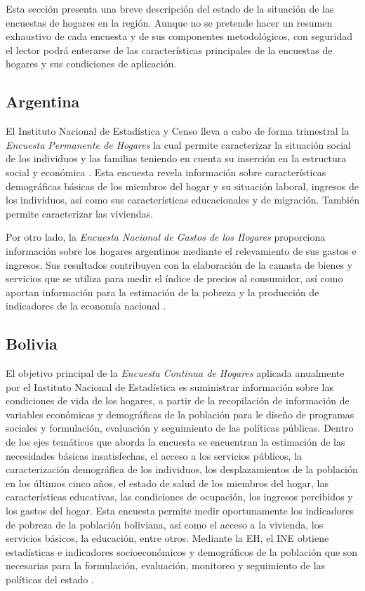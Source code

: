 Esta sección presenta una breve descripción del estado de la situación de las encuestas de hogares en la región. Aunque no se pretende hacer un resumen exhaustivo de cada encuesta y de sus componentes metodológicos, con seguridad el lector podrá enterarse de las características principales de la encuestas de hogares y sus condiciones de aplicación.

\hypertarget{argentina}{%
\subsection*{Argentina}\label{argentina}}


El Instituto Nacional de Estadística y Censo lleva a cabo de forma trimestral la \emph{Encuesta Permanente de Hogares} la cual permite caracterizar la situación social de los individuos y las familias teniendo en cuenta su inserción en la estructura social y económica \citep{INDEC-AR}. Esta encuesta revela información sobre características demográficas básicas de los miembros del hogar y su situación laboral, ingresos de los individuos, así como sus características educacionales y de migración. También permite caracterizar las viviendas.

Por otro lado, la \emph{Encuesta Nacional de Gastos de los Hogares} proporciona información sobre los hogares argentinos mediante el relevamiento de sus gastos e ingresos. Sus resultados contribuyen con la elaboración de la canasta de bienes y servicios que se utiliza para medir el índice de precios al consumidor, así como aportan información para la estimación de la pobreza y la producción de indicadores de la economía nacional \citep{INDEC-AR2}.

\hypertarget{bolivia}{%
\subsection*{Bolivia}\label{bolivia}}


El objetivo principal de la \emph{Encuesta Continua de Hogares} aplicada anualmente por el Instituto Nacional de Estadística es suministrar información sobre las condiciones de vida de los hogares, a partir de la recopilación de información de variables económicas y demográficas de la población para le diseño de programas sociales y formulación, evaluación y seguimiento de las políticas públicas. Dentro de los ejes temáticos que aborda la encuesta se encuentran la estimación de las necesidades básicas insatisfechas, el acceso a los servicios públicos, la caracterización demográfica de los individuos, los desplazamientos de la población en los últimos cinco años, el estado de salud de los miembros del hogar, las características educativas, las condiciones de ocupación, los ingresos percibidos y los gastos del hogar. Esta encuesta permite medir oportunamente los indicadores de pobreza de la población boliviana, así como el acceso a la vivienda, los servicios básicos, la educación, entre otros. Mediante la EH, el INE obtiene estadísticas e indicadores socioeconómicos y demográficos de la población que son necesarias para la formulación, evaluación, monitoreo y seguimiento de las políticas del estado \citep{INE-BO}.

